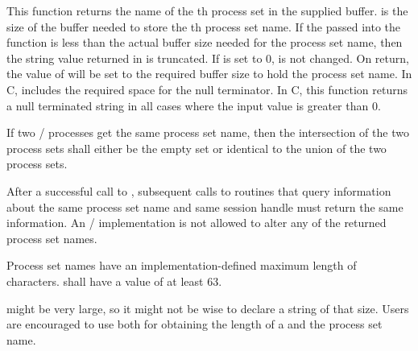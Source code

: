 This function returns the name of the th process set in the supplied  buffer.
 is the size of the buffer needed to store the th process set name.  If the  passed
into the function is less than the actual buffer size needed for the process set name,
then the string value returned in  is truncated.
If  is set to 0,  is not changed.  On return, the value of  will be set
to the required buffer size to hold the process set name.  In C,  includes the required space for the null terminator.
In C, this function returns a null terminated string in all cases where the  input value is greater than 0.

If two \MPI/ processes get the same process set name, then the intersection of the two process sets shall either be the empty set or identical to the union of the two process sets.

After a successful call to , subsequent calls to routines that query information about the same process set name and same session handle must return the same information. An \MPI/ implementation is not allowed to alter any of the returned process set names.

Process set names have an implementation-defined maximum length of  characters.   shall have a value of at least 63.

\begin{users}
 might be very large, so it
might not be wise to declare a string of that size.
Users are encouraged to use 
both for obtaining the length of a  and the process set name.
\end{users}

